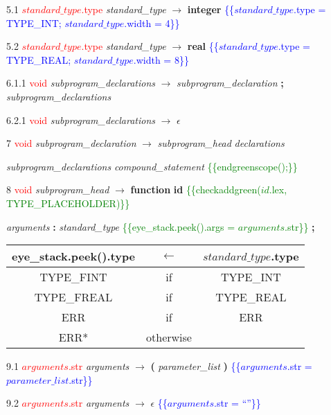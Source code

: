 \documentclass[10pt]{article}
\begin{document}
5.1  \textcolor{red}{$standard\_type$.type} \emph{standard\_type} $\rightarrow$ \textbf{integer} \textcolor{blue}{\{\{$standard\_type$.type = TYPE_INT; $standard\_type$.width = 4\}\}}

5.2  \textcolor{red}{$standard\_type$.type} \emph{standard\_type} $\rightarrow$ \textbf{real} \textcolor{blue}{\{\{$standard\_type$.type = TYPE_REAL; $standard\_type$.width = 8\}\}}

6.1.1  \textcolor{red}{void} \emph{subprogram\_declarations} $\rightarrow$ \emph{subprogram\_declaration} \textbf{;} \emph{subprogram\_declarations}

6.2.1  \textcolor{red}{void} \emph{subprogram\_declarations} $\rightarrow$ $\epsilon$

7    \textcolor{red}{void} \emph{subprogram\_declaration} $\rightarrow$ \emph{subprogram\_head} \emph{declarations}

\emph{subprogram\_declarations} \emph{compound\_statement} \textcolor{green}{\{\{endgreenscope();\}\}}

8  \textcolor{red}{void}  \emph{subprogram\_head} $\rightarrow$ \textbf{function} \textbf{id} \textcolor{green}{\{\{checkaddgreen($id$.lex, TYPE_PLACEHOLDER)\}\}}

\emph{arguments} \textbf{:} \emph{standard\_type} \textcolor{green}{\{\{eye\_stack.peek().args = $arguments$.str\}\}} \textbf{;}

\begin{tabular}[t]{|ccc|}
  \hline

  eye\_stack.peek().type & \textbf{$\leftarrow$} & $standard\_type$.type \\

  \hline

  TYPE_FINT & if & TYPE_INT \\

  TYPE_FREAL & if & TYPE_REAL \\

  ERR  & if & ERR \\

  ERR* & otherwise & \\

  \hline
\end{tabular}


9.1  \textcolor{red}{$arguments$.str} \emph{arguments} $\rightarrow$ \textbf{(} \emph{parameter\_list} \textbf{)} \textcolor{blue}{\{\{$arguments$.str = $parameter\_list$.str\}\}}

9.2  \textcolor{red}{$arguments$.str} \emph{arguments} $\rightarrow$ $\epsilon$ \textcolor{blue}{\{\{$arguments$.str = ``''\}\}}
\end{document}
